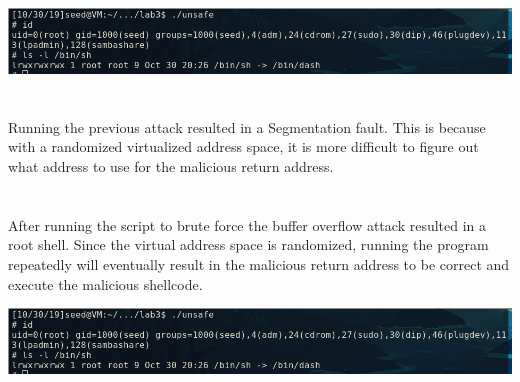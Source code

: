 \documentclass[12pt]{exam}
\begin{document}
\vspace*{.2in}
\noindent
\includegraphics[width=\textwidth]{q3}

\section{}

Running the previous attack resulted in a Segmentation fault.  This is because
with a randomized virtualized address space, it is more difficult to figure out
what address to use for the malicious return address.

\section{}

After running the script to brute force the buffer overflow attack resulted in
a root shell.  Since the virtual address space is randomized, running the
program repeatedly will eventually result in the malicious return address to be
correct and execute the malicious shellcode.

\vspace*{.2in}
\noindent
\includegraphics[width=\textwidth]{q3}
\end{document}
